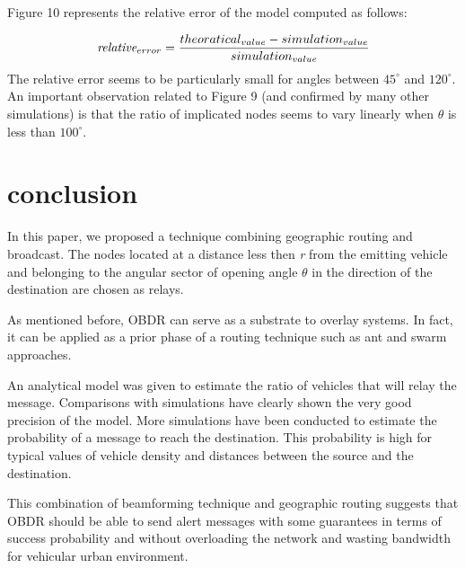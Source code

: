 \documentclass{IEEEtran}
\begin{document}
Figure 10 represents the relative error of the model computed as
follows:

\begin{equation}\label{Eq.4}
    \emph{relative}_{error}=\frac {theoratical_{value}-
    simulation_{value}}{simulation_{value}}
\end{equation}
The relative error seems to be particularly small for angles between
$45^{\circ}$ and $120^{\circ}$.\\
An important observation related to Figure 9 (and confirmed by many
other simulations) is that the ratio of implicated nodes seems to
vary linearly when $\theta$ is less than $100^{\circ}$.

\section{conclusion}
In this paper, we proposed a technique combining geographic routing
and broadcast. The nodes located at a distance less then \emph{r}
from the emitting vehicle and belonging to the angular sector of
opening angle $\theta$ in the direction of the destination are
chosen as relays.

As mentioned before, OBDR can serve as a substrate to overlay
systems. In fact, it can be applied as a prior phase of a routing
technique such as ant and swarm approaches.

An analytical model was given to estimate the ratio of vehicles that
will relay the message. Comparisons with simulations have clearly
shown the very good precision of the model. More simulations have
been conducted to estimate the probability of a message to reach the
destination. This probability is high for typical values of vehicle
density and distances between the source and the destination.

This combination of beamforming technique and geographic routing
suggests that OBDR should be able to send alert messages with some
guarantees in terms of success probability and without overloading
the network and wasting bandwidth for vehicular urban environment.
\end{document}
